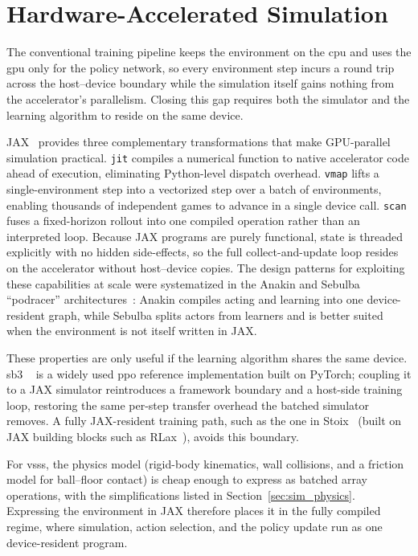 \section{Hardware-Accelerated Simulation}

The conventional training pipeline keeps the environment on the \gls{cpu} and
uses the \gls{gpu} only for the policy network, so every environment step
incurs a round trip across the host--device boundary while the simulation
itself gains nothing from the accelerator's parallelism.  Closing this gap
requires both the simulator and the learning algorithm to reside on the same
device.

JAX~\cite{jax2018github} provides three complementary transformations
that make GPU-parallel simulation practical.  \texttt{jit} compiles a
numerical function to native accelerator code ahead of execution, eliminating
Python-level dispatch overhead.  \texttt{vmap} lifts a single-environment step
into a vectorized step over a batch of environments, enabling thousands of
independent games to advance in a single device call.  \texttt{scan} fuses a
fixed-horizon rollout into one compiled operation rather than an interpreted
loop.  Because JAX programs are purely functional, state is threaded
explicitly with no hidden side-effects, so the full collect-and-update loop
resides on the accelerator without host--device copies.  The design patterns
for exploiting these capabilities at scale were systematized in the Anakin and
Sebulba ``podracer'' architectures~\cite{hessel2021podracer}: Anakin compiles
acting and learning into one device-resident graph, while Sebulba splits actors
from learners and is better suited when the environment is not itself written
in JAX.

These properties are only useful if the learning algorithm shares the same
device. \gls{sb3} ~\cite{raffin2021sb3} is a widely used \gls{ppo}
reference implementation built on PyTorch; coupling it to a JAX
simulator reintroduces a framework boundary and a host-side training loop,
restoring the same per-step transfer overhead the batched simulator removes.
A fully JAX-resident training path, such as the one in
Stoix~\cite{toledo2024stoix} (built on JAX building blocks such as RLax~\cite{deepmind2020rlax}), avoids this
boundary.

For \gls{vsss}, the physics model (rigid-body kinematics, wall collisions, and a friction model for ball--floor contact) is cheap enough to
express as batched array operations, with the simplifications listed in Section~\ref{sec:sim_physics}.  Expressing the environment in JAX
therefore places it in the fully compiled regime, where simulation, action
selection, and the policy update run as one device-resident program.
